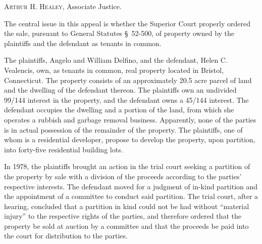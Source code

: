
\opinion \textsc{Arthur H. Healey}, Associate Justice.

The central issue in this appeal is whether the Superior Court properly ordered
the sale, pursuant to General Statutes \S~52-500, of property owned by the plaintiffs and the defendant
as tenants in common.

The plaintiffs, Angelo and William Delfino, and the defendant, Helen C.
Vealencis, own, as tenants in common, real property located in Bristol,
Connecticut. The property consists of an approximately 20.5 acre parcel of land
and the dwelling of the defendant thereon. The plaintiffs own an undivided
99/144 interest in the property, and the defendant owns a 45/144 interest. The
defendant occupies the dwelling and a portion of the land, from which she
operates a rubbish and garbage removal
business. Apparently, none of the parties is in actual
possession of the remainder of the property. The plaintiffs, one of whom is a
residential developer, propose to develop the property, upon partition, into
forty-five residential building lots.


In 1978, the plaintiffs brought an action in the trial court seeking a partition
of the property by sale with a division of the proceeds according to the
parties' respective interests. The defendant moved for a judgment of in-kind
partition and the appointment of a committee to conduct said partition. The
trial court, after a hearing, concluded that a partition in kind could not be
had without ``material injury'' to the respective rights of the parties, and
therefore ordered that the property be sold at auction by a committee and that
the proceeds be paid into the court for distribution to the parties.

